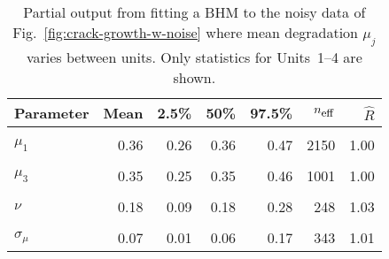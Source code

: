 \begin{table}
\centering
\caption{\label{tab:pp_mu}Partial output from fitting a BHM to the noisy data of Fig.~\ref{fig:crack-growth-w-noise} where mean degradation $\mu_j$ varies between units. Only statistics for Units~1--4 are shown.}
\centering
\begin{tabular}[t]{lrrrrrr}
\toprule
Parameter & Mean & 2.5\% & 50\% & 97.5\% & $n_{\small{\mbox{eff}}}$ & $\hat{R}$\\
\midrule
\cellcolor{gray!10}{$\sigma$} & \cellcolor{gray!10}{0.03} & \cellcolor{gray!10}{0.02} & \cellcolor{gray!10}{0.03} & \cellcolor{gray!10}{0.04} & \cellcolor{gray!10}{747} & \cellcolor{gray!10}{1.01}\\
$\mu_1$ & 0.36 & 0.26 & 0.36 & 0.47 & 2150 & 1.00\\
\cellcolor{gray!10}{$\mu_2$} & \cellcolor{gray!10}{0.42} & \cellcolor{gray!10}{0.33} & \cellcolor{gray!10}{0.42} & \cellcolor{gray!10}{0.56} & \cellcolor{gray!10}{954} & \cellcolor{gray!10}{1.00}\\
$\mu_3$ & 0.35 & 0.25 & 0.35 & 0.46 & 1001 & 1.00\\
\cellcolor{gray!10}{$\mu_4$} & \cellcolor{gray!10}{0.34} & \cellcolor{gray!10}{0.23} & \cellcolor{gray!10}{0.34} & \cellcolor{gray!10}{0.45} & \cellcolor{gray!10}{746} & \cellcolor{gray!10}{1.01}\\
\addlinespace
$\nu$ & 0.18 & 0.09 & 0.18 & 0.28 & 248 & 1.03\\
\cellcolor{gray!10}{$\mu_\mu$} & \cellcolor{gray!10}{0.38} & \cellcolor{gray!10}{0.32} & \cellcolor{gray!10}{0.38} & \cellcolor{gray!10}{0.46} & \cellcolor{gray!10}{3079} & \cellcolor{gray!10}{1.00}\\
$\sigma_\mu$ & 0.07 & 0.01 & 0.06 & 0.17 & 343 & 1.01\\
\bottomrule
\end{tabular}
\end{table}
